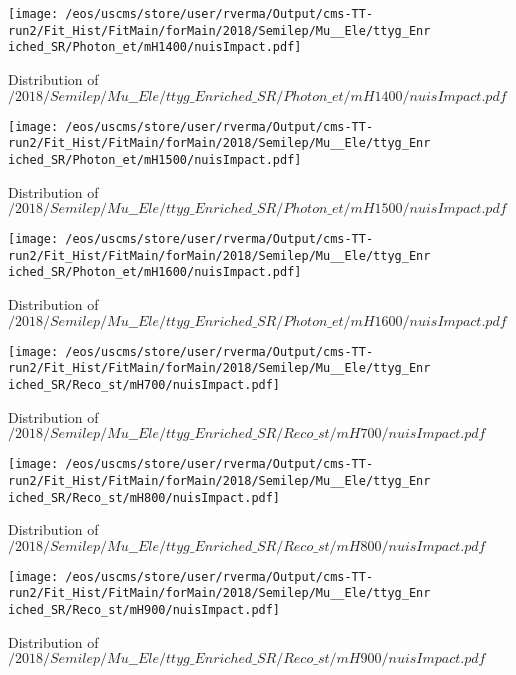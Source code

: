 \begin{figure}
\centering
\texttt{[image: /eos/uscms/store/user/rverma/Output/cms-TT-run2/Fit\_Hist/FitMain/forMain/2018/Semilep/Mu\_\_Ele/ttyg\_Enriched\_SR/Photon\_et/mH1400/nuisImpact.pdf]}
\caption{Distribution of $/2018/Semilep/Mu\_\_Ele/ttyg\_Enriched\_SR/Photon\_et/mH1400/nuisImpact.pdf$}
\end{figure}

\begin{figure}
\centering
\texttt{[image: /eos/uscms/store/user/rverma/Output/cms-TT-run2/Fit\_Hist/FitMain/forMain/2018/Semilep/Mu\_\_Ele/ttyg\_Enriched\_SR/Photon\_et/mH1500/nuisImpact.pdf]}
\caption{Distribution of $/2018/Semilep/Mu\_\_Ele/ttyg\_Enriched\_SR/Photon\_et/mH1500/nuisImpact.pdf$}
\end{figure}

\begin{figure}
\centering
\texttt{[image: /eos/uscms/store/user/rverma/Output/cms-TT-run2/Fit\_Hist/FitMain/forMain/2018/Semilep/Mu\_\_Ele/ttyg\_Enriched\_SR/Photon\_et/mH1600/nuisImpact.pdf]}
\caption{Distribution of $/2018/Semilep/Mu\_\_Ele/ttyg\_Enriched\_SR/Photon\_et/mH1600/nuisImpact.pdf$}
\end{figure}

\begin{figure}
\centering
\texttt{[image: /eos/uscms/store/user/rverma/Output/cms-TT-run2/Fit\_Hist/FitMain/forMain/2018/Semilep/Mu\_\_Ele/ttyg\_Enriched\_SR/Reco\_st/mH700/nuisImpact.pdf]}
\caption{Distribution of $/2018/Semilep/Mu\_\_Ele/ttyg\_Enriched\_SR/Reco\_st/mH700/nuisImpact.pdf$}
\end{figure}

\begin{figure}
\centering
\texttt{[image: /eos/uscms/store/user/rverma/Output/cms-TT-run2/Fit\_Hist/FitMain/forMain/2018/Semilep/Mu\_\_Ele/ttyg\_Enriched\_SR/Reco\_st/mH800/nuisImpact.pdf]}
\caption{Distribution of $/2018/Semilep/Mu\_\_Ele/ttyg\_Enriched\_SR/Reco\_st/mH800/nuisImpact.pdf$}
\end{figure}

\begin{figure}
\centering
\texttt{[image: /eos/uscms/store/user/rverma/Output/cms-TT-run2/Fit\_Hist/FitMain/forMain/2018/Semilep/Mu\_\_Ele/ttyg\_Enriched\_SR/Reco\_st/mH900/nuisImpact.pdf]}
\caption{Distribution of $/2018/Semilep/Mu\_\_Ele/ttyg\_Enriched\_SR/Reco\_st/mH900/nuisImpact.pdf$}
\end{figure}


